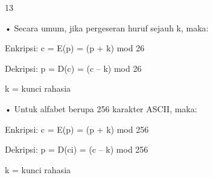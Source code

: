 \documentclass{article}
\begin{document}

13

• Secara umum, jika pergeseran huruf sejauh k, maka:


 Enkripsi: c = E(p) = (p + k) mod 26

 Dekripsi: p = D(c) = (c – k) mod 26


       k = kunci rahasia

• Untuk alfabet berupa 256 karakter ASCII, maka:


 Enkripsi: c = E(p) = (p + k) mod 256

 Dekripsi: p = D(ci) = (c – k) mod 256

                   k = kunci rahasia
\end{document}
